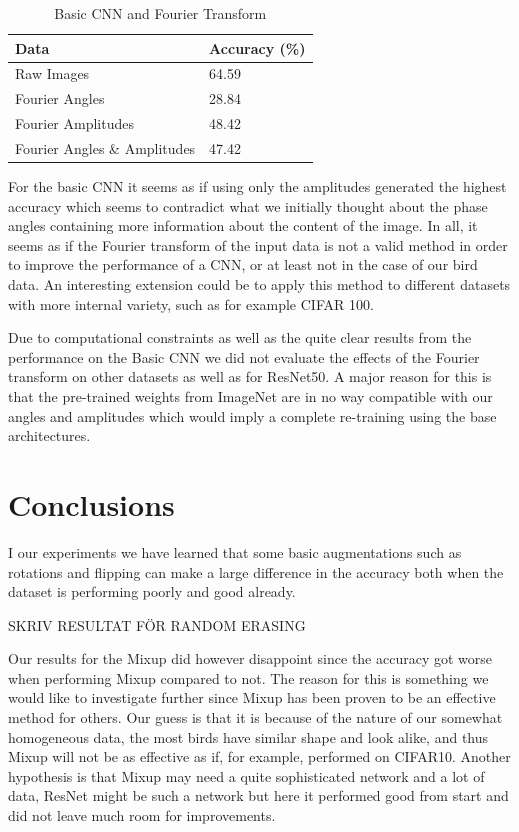 \documentclass{article}
\begin{document}
\begin{table}[H]
  \caption{Basic CNN and Fourier Transform}
  \label{sample-table}
  \centering
  \begin{tabular}{ll}
    \toprule
    Data & Accuracy (\%) \\
    \midrule
    Raw Images  & 64.59 \\
    Fourier Angles & 28.84   \\
    Fourier Amplitudes & 48.42 \\
    Fourier Angles \& Amplitudes & 47.42 \\
    \bottomrule
  \end{tabular}
\end{table}

For the basic CNN it seems as if using only the amplitudes generated the highest accuracy which seems to contradict what we initially thought about the phase angles containing more information about the content of the image. In all, it seems as if the Fourier transform of the input data is not a valid method in order to improve the performance of a CNN, or at least not in the case of our bird data. An interesting extension could be to apply this method to different datasets with more internal variety, such as for example CIFAR 100.

\medskip

Due to computational constraints as well as the quite clear results from the performance on the Basic CNN we 
did not evaluate the effects of the Fourier transform on other datasets as well as for ResNet50. 
A major reason for this is that the pre-trained weights from ImageNet are in no way 
compatible with our angles and amplitudes which would imply a complete re-training using the base architectures.

\section{Conclusions}



I our experiments we have learned that some basic augmentations such as rotations and flipping can make a large difference in the accuracy both when the dataset is performing poorly and good already.

SKRIV RESULTAT FÖR RANDOM ERASING

Our results for the Mixup did however disappoint since the accuracy got worse when performing Mixup compared to not. 
The reason for this is something we would like to investigate further since Mixup has been proven to be an effective method for others. Our guess is that it is because of the nature of our somewhat homogeneous data, the most birds have similar shape and look alike, and thus Mixup will not be as effective as if, for example, performed on CIFAR10. Another hypothesis is that Mixup may need a quite sophisticated network and a lot of data, ResNet might be such a network but here it performed good from start and did not leave much room for improvements.
\end{document}

